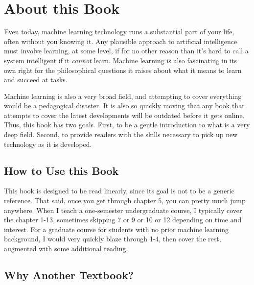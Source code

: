 
\chapter{About this Book} \label{sec:intro}

Even today, machine learning technology runs a substantial part of your life, often without you knowing it.
Any plausible approach to artificial intelligence must involve learning, at some level, if for no other reason than it's hard to call a system intelligent if it \emph{cannot} learn.
Machine learning is also fascinating in its own right for the philosophical questions it raises about what it means to learn and succeed at tasks.

Machine learning is also a very broad field, and attempting to cover everything would be a pedagogical disaster.
It is also so quickly moving that any book that attempts to cover the latest developments will be outdated before it gets online.
Thus, this book has two goals.
First, to be a gentle introduction to what is a very deep field.
Second, to provide readers with the skills necessary to pick up new technology as it is developed.

\section{How to Use this Book}

This book is designed to be read linearly, since its goal is not to be a generic reference.
That said, once you get through chapter 5, you can pretty much jump anywhere.
When I teach a one-semester undergraduate course, I typically cover the chapter 1-13, sometimes skipping 7 or 9 or 10 or 12 depending on time and interest.
For a graduate course for students with no prior machine learning background, I would very quickly blaze through 1-4, then cover the rest, augmented with some additional reading.


\section{Why Another Textbook?}

